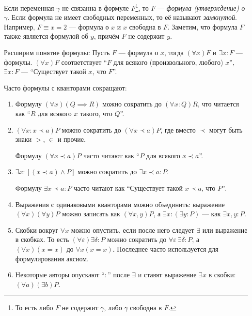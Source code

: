 Если переменная $\gamma$
не связанна в формуле $F$\footnote{
	То есть либо $F$ не содержит $\gamma$, либо $\gamma$ свободна в $F$.
}, то $F$ --- {\it формула (утверждение) о} $\gamma$. Если формула не имеет
свободных переменных, то её называют {\it замкнутой}.
Например, $F\equiv x=2$ --- формула о $x$ и $x$ свободна в $F$.
Заметим, что формула $F$ также является формулой об $y$, причём $F$ не содержит $y$.

Расширим понятие формулы: Пусть $F$ --- формула о $x$, тогда ${(\forall x)F}$
и ${\exists x:F}$ --- формулы. $(\forall x)F$ соответствует
``$F$ для всякого (произвольного, любого) $x$'', $\exists x:F$ ---
``Существует такой $x$, что $F$''.

Часто формулы с кванторами сокращают:
\begin{fullwidth}
	\begin{multicols}{2}
		\begin{enumerate}
			\item{}Формулу ${(\forall x)(Q\implies R)}$ можно сократить
			до ${(\forall x:Q)R}$, что читается как ``$R$ для всякого $x$ такого,
			что $Q$''.

			\item{}${(\forall x:x\prec a)P}$ можно сократить до ${(\forall x\prec a)P}$,
			где вместо $\prec$ могут быть знаки $>$, $\in$ и прочие.

			Формулу ${(\forall x\prec a)P}$ часто читают как
			``$P$ для всякого $x\prec a$''.

			\item{}$\exists x:[(x\prec a)\land P]$ можно сократить
			до $\exists x\prec a:P$.

			Формулу ${\exists x\prec a:P}$ часто читают как
			``Существует такой $x\prec a$, что $P$''.

			\columnbreak

			\item{}Выражения с одинаковыми кванторами можно объединить:
			выражение $(\forall x)(\forall y)P$ можно записать как $(\forall x,y)P$,
			а ${\exists x:(\exists y:P)}$ --- как $\exists x,y:P$.

			\item{}Скобки вокруг $\forall x$ можно опустить,
			если после него следует $\exists$ или выражение в скобках.
			То есть ${(\forall \varepsilon)\exists \delta:P}$
			можно сократить до $\forall \varepsilon~\exists \delta:P$,
			а $(\forall x)(x=x)$ до $\forall x(x=x)$.
			Последнее часто используется для формулирования аксиом.

			\item{}Некоторые авторы опускают ``$:$'' после $\exists$ и
			ставят выражение $\exists x$ в скобки: $(\forall a)(\exists b)P$.
		\end{enumerate}
	\end{multicols}
\end{fullwidth}

